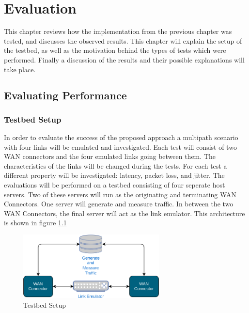 
\cleardoublepage
\chapter{Evaluation}
\label{cha:evaluation}

This chapter reviews how the implementation from the previous chapter was tested, and discusses the observed results. This chapter will explain the setup of the testbed, as well as the motivation behind the types of tests which were performed. Finally a discussion of the results and their possible explanations will take place.


\section{Evaluating Performance}

\subsection{Testbed Setup}

In order to evaluate the success of the proposed approach a multipath scenario with four links will be emulated and investigated. Each test will consist of two WAN connectors and the four emulated links going between them. The characteristics of the links will be changed during the tests. For each test a different property will be investigated: latency, packet loss, and jitter. The evaluations will be performed on a testbed consisting of four seperate host servers. Two of these servers will run as the originating and terminating WAN Connectors. One server will generate and measure traffic. In between the two WAN Connectors, the final server will act as the link emulator. This architecture is shown in figure \ref{fig:testbed}

\begin{figure}[h]
    \centering
        \includegraphics[width=0.66\textwidth]{fig/testbed.png}
        \caption{Testbed Setup}
        \label{fig:testbed}
\end{figure}


